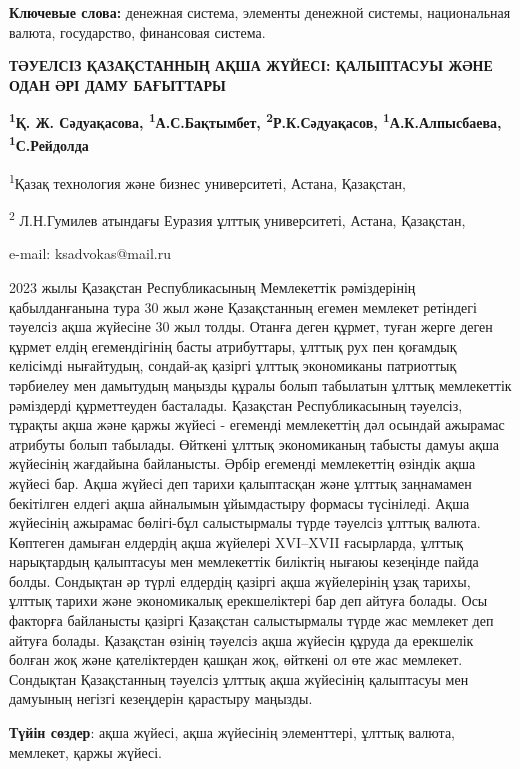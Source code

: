 {\bfseries Ключевые слова:} денежная система, элементы денежной системы,
национальная валюта, государство, финансовая система.

\begin{center}
{\large\bfseries ТӘУЕЛСІЗ ҚАЗАҚСТАННЫҢ АҚША ЖҮЙЕСІ: ҚАЛЫПТАСУЫ ЖӘНЕ ОДАН ӘРІ ДАМУ БАҒЫТТАРЫ}

{\bfseries \textsuperscript{1}Қ. Ж. Сәдуақасова,
\textsuperscript{1}А.С.Бақтымбет, \textsuperscript{2}Р.К.Сәдуақасов, \textsuperscript{1}А.К.Алпысбаева,
\textsuperscript{1}С.Рейдолда}

\textsuperscript{1}Қазақ технология және бизнес университеті, Астана,
Қазақстан,

\textsuperscript{2} Л.Н.Гумилев атындағы Еуразия ұлттық университеті,
Астана, Қазақстан,

e-mail: ksadvokas@mail.ru
\end{center}

2023 жылы Қазақстан Республикасының Мемлекеттік рәміздерінің
қабылданғанына тура 30 жыл және Қазақстанның егемен мемлекет ретіндегі
тәуелсіз ақша жүйесіне 30 жыл толды. Отанға деген құрмет, туған жерге
деген құрмет елдің егемендігінің басты атрибуттары, ұлттық рух пен
қоғамдық келісімді нығайтудың, сондай-ақ қазіргі ұлттық экономиканы
патриоттық тәрбиелеу мен дамытудың маңызды құралы болып табылатын ұлттық
мемлекеттік рәміздерді құрметтеуден басталады. Қазақстан Республикасының
тәуелсіз, тұрақты ақша және қаржы жүйесі - егеменді мемлекеттің дәл
осындай ажырамас атрибуты болып табылады. Өйткені ұлттық экономиканың
табысты дамуы ақша жүйесінің жағдайына байланысты. Әрбір егеменді
мемлекеттің өзіндік ақша жүйесі бар. Ақша жүйесі деп тарихи қалыптасқан
және ұлттық заңнамамен бекітілген елдегі ақша айналымын ұйымдастыру
формасы түсініледі. Ақша жүйесінің ажырамас бөлігі-бұл салыстырмалы
түрде тәуелсіз ұлттық валюта. Көптеген дамыған елдердің ақша жүйелері
XVI--XVII ғасырларда, ұлттық нарықтардың қалыптасуы мен мемлекеттік
биліктің нығаюы кезеңінде пайда болды. Сондықтан әр түрлі елдердің
қазіргі ақша жүйелерінің ұзақ тарихы, ұлттық тарихи және экономикалық
ерекшеліктері бар деп айтуға болады. Осы факторға байланысты қазіргі
Қазақстан салыстырмалы түрде жас мемлекет деп айтуға болады. Қазақстан
өзінің тәуелсіз ақша жүйесін құруда да ерекшелік болған жоқ және
қателіктерден қашқан жоқ, өйткені ол өте жас мемлекет. Сондықтан
Қазақстанның тәуелсіз ұлттық ақша жүйесінің қалыптасуы мен дамуының
негізгі кезеңдерін қарастыру маңызды.

{\bfseries Түйін сөздер}: ақша жүйесі, ақша жүйесінің элементтері, ұлттық
валюта, мемлекет, қаржы жүйесі.

